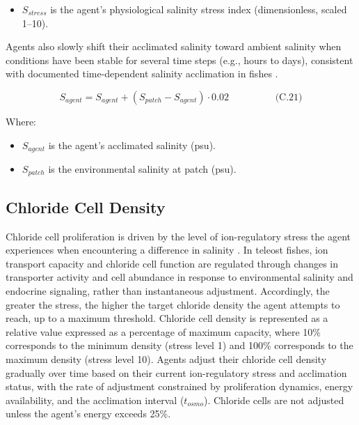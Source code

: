 \documentclass[
]{book}
\providecommand{\tightlist}{%
  \setlength{\itemsep}{0pt}\setlength{\parskip}{0pt}}
\begin{document}
\begin{itemize}
\tightlist
\item
  \(S_{stress}\) is the agent's physiological salinity stress index
  (dimensionless, scaled 1--10).
\end{itemize}

Agents also slowly shift their acclimated salinity toward ambient
salinity when conditions have been stable for several time steps (e.g.,
hours to days), consistent with documented time-dependent salinity
acclimation in fishes \citep{evans_osmotic_2008}.

\[
\begin{equation} S_{agent} = S_{agent} + (S_{patch} - S_{agent}) \cdot 0.02   \hspace{2cm} \text{(C.21)} \end{equation}
\]

Where:

\begin{itemize}
\tightlist
\item
  \(S_{agent}\) is the agent's acclimated salinity (psu).
\item
  \(S_{patch}\) is the environmental salinity at patch (psu).
\end{itemize}

\subsection{Chloride Cell Density}\label{chloride-cell-density}

Chloride cell proliferation is driven by the level of ion-regulatory
stress the agent experiences when encountering a difference in salinity
\citep{evans_osmotic_2008}. In teleost fishes, ion transport capacity and
chloride cell function are regulated through changes in transporter
activity and cell abundance in response to environmental salinity and
endocrine signaling, rather than instantaneous adjustment. Accordingly,
the greater the stress, the higher the target chloride density the agent
attempts to reach, up to a maximum threshold. Chloride cell density is
represented as a relative value expressed as a percentage of maximum
capacity, where 10\% corresponds to the minimum density (stress level 1)
and 100\% corresponds to the maximum density (stress level 10). Agents
adjust their chloride cell density gradually over time based on their
current ion-regulatory stress and acclimation status, with the rate of
adjustment constrained by proliferation dynamics, energy availability,
and the acclimation interval (\(t_{osmo}\)). Chloride cells are not
adjusted unless the agent's energy exceeds 25\%.
\end{document}
